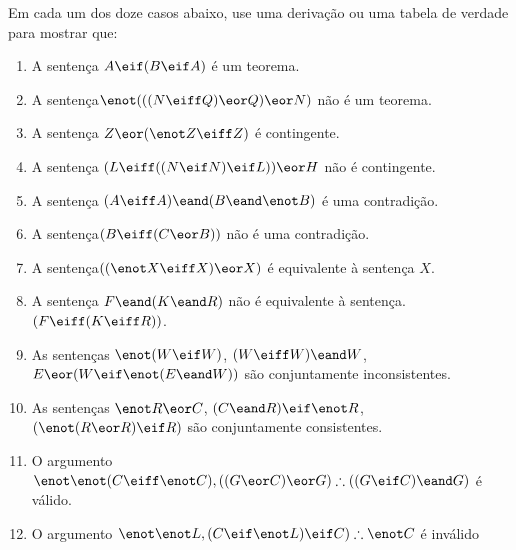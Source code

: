 \noindent\problempart Em cada um dos doze casos abaixo, use uma  derivação ou uma tabela de verdade para mostrar que:
\begin{enumerate}%
\item A sentença $A \eif (B \eif A)$ é um teorema.
\item A sentença$\enot (((N \eiff Q) \eor Q) \eor N)$ não é um teorema.
\item A sentença $ Z \eor (\enot Z \eiff Z) $ é contingente.
\item A sentença $ (L \eiff ((N \eif N) \eif L)) \eor H $ não é contingente.
\item A sentença $ (A \eiff A) \eand (B \eand \enot B)$ é uma contradição.
\item A sentença$ (B \eiff (C \eor B)) $ não é uma contradição. 
\item A sentença$ ((\enot X \eiff X) \eor X) $  é equivalente à sentença $X$.
\item A sentença $F \eand (K \eand R) $ não  é equivalente à sentença. $ (F \eiff (K \eiff R)) $.
\item As sentenças $ \enot (W \eif W)$, $(W \eiff W) \eand W$, $E \eor (W \eif \enot (E \eand W))$ são conjuntamente inconsistentes. 

\item As sentenças  $\enot R \eor C $, $(C \eand R) \eif \enot R$, $(\enot (R \eor R) \eif R) $ são conjuntamente consistentes.
\item O argumento $\enot \enot (C \eiff \enot C), ((G \eor C) \eor G) \therefore ((G \eif C) \eand G) $ é válido.
\item O argumento $ \enot \enot L,  (C \eif \enot L) \eif C) \therefore \enot C$  é  inválido
\end{enumerate}

